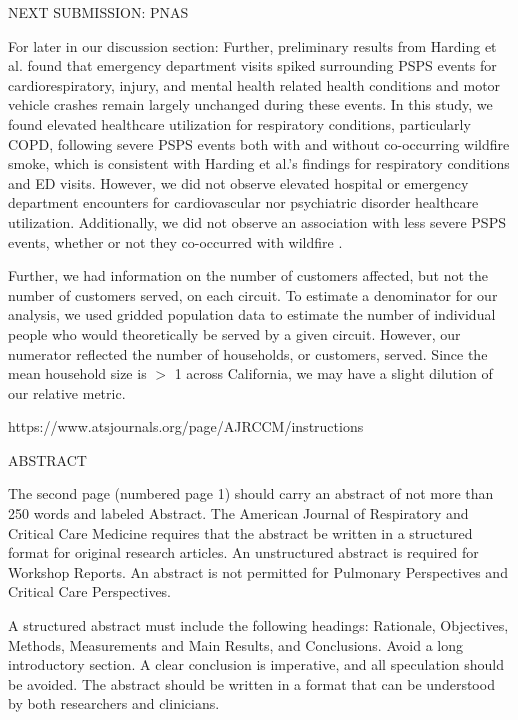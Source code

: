 NEXT SUBMISSION: PNAS


For later in our discussion section: 
Further, preliminary results from Harding et al. found that emergency department visits spiked surrounding PSPS events for cardiorespiratory, injury, and mental health related health conditions\citep{harding2024association} and motor vehicle crashes remain largely unchanged during these events.\citep{harding2025a} In this study, we found elevated healthcare utilization for respiratory conditions, particularly COPD, following severe PSPS events both with and without co-occurring wildfire smoke, which is consistent with Harding et al.'s findings for respiratory conditions and ED visits.\citep{harding2024association} However, we did not observe elevated hospital or emergency department encounters for cardiovascular nor psychiatric disorder healthcare utilization. Additionally, we did not observe an association with less severe PSPS events, whether or not they co-occurred with wildfire \PM.  

Further, we had information on the number of customers affected, but not the number of customers served, on each circuit. To estimate a denominator for our analysis, we used gridded population data to estimate the number of individual people who would theoretically be served by a given circuit. However, our numerator reflected the number of households, or customers, served. Since the mean household size is $>$ 1 across California, we may have a slight dilution of our relative metric. 



https://www.atsjournals.org/page/AJRCCM/instructions


ABSTRACT

The second page (numbered page 1) should carry an abstract of not more than 250 words and labeled Abstract. The American Journal of Respiratory and Critical Care Medicine requires that the abstract be written in a structured format for original research articles. An unstructured abstract is required for Workshop Reports. An abstract is not permitted for Pulmonary Perspectives and Critical Care Perspectives.

A structured abstract must include the following headings: Rationale, Objectives, Methods, Measurements and Main Results, and Conclusions. Avoid a long introductory section. A clear conclusion is imperative, and all speculation should be avoided. The abstract should be written in a format that can be understood by both researchers and clinicians.

